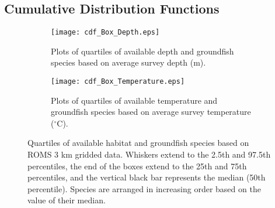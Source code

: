 \documentclass[11pt]{book}\usepackage[]{graphicx}\usepackage[]{color}
\begin{document}
\newpage
\clearpage

\subsection{Cumulative Distribution Functions}

\graphicspath{ {c:/GitHub/SPERA-Maps/Results/Figures/} }
\begin{figure*}
    \centering
    \begin{subfigure}[b]{0.475\textwidth}
    \centering
    \texttt{[image: cdf\_Box\_Depth.eps]}
    \caption[]
      {{\small Plots of quartiles of available depth and groundfish species based on average survey depth (m).}}    
    \label{fig:cdf.box.depth}
        \end{subfigure}
    \hfill
    \begin{subfigure}[b]{0.475\textwidth}  
    \centering 
    \texttt{[image: cdf\_Box\_Temperature.eps]}
    \caption[]%
     {{\small Plots of quartiles of available temperature and groundfish species based on average survey temperature ($^\circ$C).}}    
    \label{fig:cdf.box.temp}
    \end{subfigure}
    \caption[ ]
     {\small Quartiles of available habitat and groundfish species based on ROMS 3 km gridded data. Whiskers extend to the 2.5th and 97.5th percentiles, the end of the boxes extend to the 25th and 75th percentiles, and the vertical black bar represents the median (50th percentile). Species are arranged in increasing order based on the value of their median.} 
    \label{fig:cdf.box.survey}
    \end{figure*}
 
\end{document}
